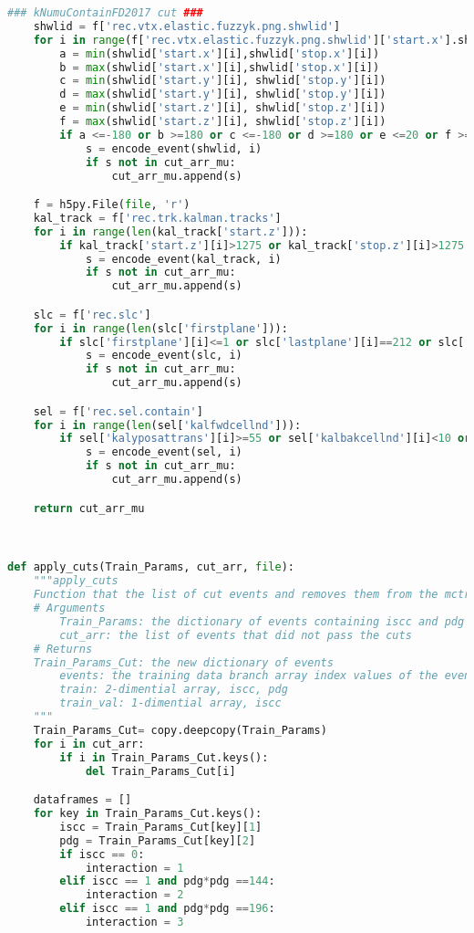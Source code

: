\begin{lstlisting}[language=Python]
    ### kNumuContainFD2017 cut ###
    shwlid = f['rec.vtx.elastic.fuzzyk.png.shwlid']
    for i in range(f['rec.vtx.elastic.fuzzyk.png.shwlid']['start.x'].shape[1]):
        a = min(shwlid['start.x'][i],shwlid['stop.x'][i])
        b = max(shwlid['start.x'][i],shwlid['stop.x'][i])
        c = min(shwlid['start.y'][i], shwlid['stop.y'][i])
        d = max(shwlid['start.y'][i], shwlid['stop.y'][i])
        e = min(shwlid['start.z'][i], shwlid['stop.z'][i])
        f = max(shwlid['start.z'][i], shwlid['stop.z'][i])
        if a <=-180 or b >=180 or c <=-180 or d >=180 or e <=20 or f >=1525:
            s = encode_event(shwlid, i)
            if s not in cut_arr_mu:
                cut_arr_mu.append(s)

    f = h5py.File(file, 'r')
    kal_track = f['rec.trk.kalman.tracks']
    for i in range(len(kal_track['start.z'])):
        if kal_track['start.z'][i]>1275 or kal_track['stop.z'][i]>1275:
            s = encode_event(kal_track, i)
            if s not in cut_arr_mu:
                cut_arr_mu.append(s)

    slc = f['rec.slc']
    for i in range(len(slc['firstplane'])):
        if slc['firstplane'][i]<=1 or slc['lastplane'][i]==212 or slc['lastplane'][i]==213:
            s = encode_event(slc, i)
            if s not in cut_arr_mu:
                cut_arr_mu.append(s)

    sel = f['rec.sel.contain']
    for i in range(len(sel['kalfwdcellnd'])):
        if sel['kalyposattrans'][i]>=55 or sel['kalbakcellnd'][i]<10 or sel['kalfwdcellnd'][i]<5:
            s = encode_event(sel, i)
            if s not in cut_arr_mu:
                cut_arr_mu.append(s)

    return cut_arr_mu



def apply_cuts(Train_Params, cut_arr, file):
    """apply_cuts
    Function that the list of cut events and removes them from the mctruth events dictionary
    # Arguments
        Train_Params: the dictionary of events containing iscc and pdg data
        cut_arr: the list of events that did not pass the cuts
    # Returns
	Train_Params_Cut: the new dictionary of events
        events: the training data branch array index values of the events that passed the cut
        train: 2-dimential array, iscc, pdg
        train_val: 1-dimential array, iscc
    """
    Train_Params_Cut= copy.deepcopy(Train_Params)
    for i in cut_arr:
        if i in Train_Params_Cut.keys():
            del Train_Params_Cut[i]

    dataframes = []
    for key in Train_Params_Cut.keys():
        iscc = Train_Params_Cut[key][1]
        pdg = Train_Params_Cut[key][2]
        if iscc == 0:
            interaction = 1
        elif iscc == 1 and pdg*pdg ==144:
            interaction = 2
        elif iscc == 1 and pdg*pdg ==196:
            interaction = 3


\end{lstlisting}
